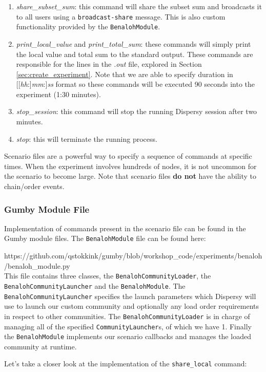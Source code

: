 \documentclass{article}
\begin{document}
\begin{enumerate}
	\item \emph{share\_subset\_sum}: this command will share the subset sum and broadcasts it to all users using a \texttt{broadcast-share} message. This is also custom functionality provided by the \texttt{BenalohModule}.
	\item \emph{print\_local\_value} and \emph{print\_total\_sum}: these commands will simply print the local value and total sum to the standard output. These commands are responsible for the lines in the \emph{.out} file, explored in Section \ref{sec:create_experiment}. Note that we are able to specify duration in [[\emph{hh}:]\emph{mm}:]\emph{ss} format so these commands will be executed 90 seconds into the experiment (1:30 minutes).
	\item \emph{stop\_session}: this command will stop the running Dispersy session after two minutes.
	\item \emph{stop}: this will terminate the running process.
\end{enumerate}

Scenario files are a powerful way to specify a sequence of commands at specific times.
When the experiment involves hundreds of nodes, it is not uncommon for the scenario to become large.
Note that scenario files \textbf{do not} have the ability to chain/order events.

\subsubsection{Gumby Module File}
\label{sec:gumby_module}
Implementation of commands present in the scenario file can be found in the Gumby module files.
The \texttt{BenalohModule} file can be found here:

https://github.com/qstokkink/gumby/blob/workshop\_code/experiments/benaloh/benaloh\_module.py\\

This file contains three classes, the \texttt{BenalohCommunityLoader}, the \texttt{BenalohCommunityLauncher} and the \texttt{BenalohModule}.
The \texttt{BenalohCommunityLauncher} specifies the launch parameters which Dispersy will use to launch our custom community and optionally any load order requirements in respect to other communities.
The \texttt{BenalohCommunityLoader} is in charge of managing all of the specified \texttt{CommunityLauncher}s, of which we have 1.
Finally the \texttt{BenalohModule} implements our scenario callbacks and manages the loaded community at runtime.

Let's take a closer look at the implementation of the \texttt{share\_local} command:
\end{document}
